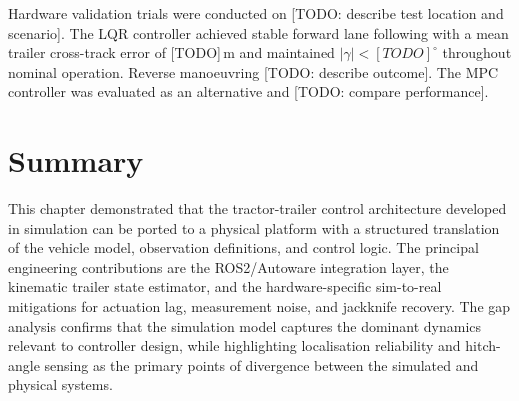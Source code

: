 Hardware validation trials were conducted on [TODO: describe test location and scenario]. The LQR controller achieved stable forward lane following with a mean trailer cross-track error of [TODO]\,m and maintained $|\gamma| < [TODO]^\circ$ throughout nominal operation. Reverse manoeuvring [TODO: describe outcome]. The MPC controller was evaluated as an alternative and [TODO: compare performance].

\section{Summary}

This chapter demonstrated that the tractor-trailer control architecture developed in simulation can be ported to a physical platform with a structured translation of the vehicle model, observation definitions, and control logic. The principal engineering contributions are the ROS2/Autoware integration layer, the kinematic trailer state estimator, and the hardware-specific sim-to-real mitigations for actuation lag, measurement noise, and jackknife recovery. The gap analysis confirms that the simulation model captures the dominant dynamics relevant to controller design, while highlighting localisation reliability and hitch-angle sensing as the primary points of divergence between the simulated and physical systems.
